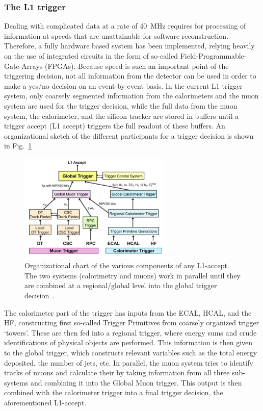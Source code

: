 \subsubsection*{The L1 trigger}
Dealing with complicated data at a rate of \SI{40}{\mega\hertz} requires for processing of information at speeds that are unattainable for software reconstruction. 
Therefore, a fully hardware based system has been implemented, relying heavily on the use of integrated circuits in the form of so-called Field-Programmable-Gate-Arrays (FPGAs).
Because speed is such an important point of the triggering decision, not all information from the detector can be used in order to make a yes/no decision on an event-by-event
basis. In the current L1 trigger system, only coarsely segmented information from the calorimeters and the muon system are used for the trigger decision, 
while the full data from the muon system, the calorimeter, and the silicon tracker are stored in buffers until a trigger accept (L1 accept) triggers the full readout of these buffers.
An organizational sketch of the different participants for a trigger decision is shown in Fig.~\ref{fig:l1}
\begin{figure}[h!]
    \centering
    \includegraphics[width=0.65\textwidth]{../figs/l1_organi.png}
    \caption{Organizational chart of the various components of any L1-accept. The two systems (calorimetry and muons) work in parallel 
until they are combined at a regional/global level into the global trigger decision~\cite{cmsdetector}.}
    \label{fig:l1}
\end{figure}
The calorimeter part of the trigger has inputs from the ECAL, HCAL, and the HF, constructing first so-called Trigger Primitives from coarsely organized trigger `towers'. These are
then fed into a regional trigger, where energy sums and crude identifications of physical objects are performed. This information is then given to the global trigger, which constructs
relevant variables such as the total energy deposited, the number of jets, etc.
In parallel, the muon system tries to identify tracks of muons and calculate their \pt by taking information from all three sub-systems and combining it into the Global
Muon trigger. This output is then combined with the calorimeter trigger into a final trigger decision, the aforementioned L1-accept.


